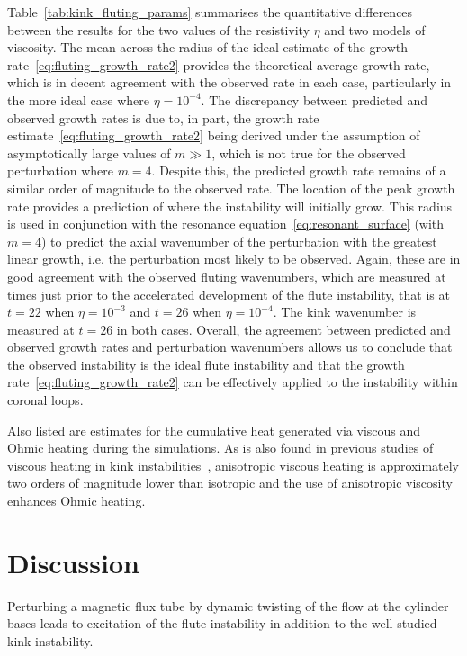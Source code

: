 \documentclass[fleqn,usenatbib]{mnras}
\newcommand{\rev}[1]{{\color{red} {#1}}}
\begin{document}
Table~\ref{tab:kink_fluting_params} summarises the quantitative differences
between the results for the two values of the resistivity $\eta$ and two models
of viscosity. \rev{The mean across the radius of the ideal estimate of the
growth rate~\eqref{eq:fluting_growth_rate2} provides the theoretical average
growth rate, which is in decent agreement with the observed rate in each case,
particularly in the more ideal case where $\eta=10^{-4}$. \rev{The
  discrepancy between predicted and observed growth rates is due to,
  in part, the growth rate estimate~\eqref{eq:fluting_growth_rate2}
  being derived under the assumption of asymptotically large values of
  $m \gg 1$, which is not true for the observed perturbation where
  $m=4$. Despite this, the predicted growth rate remains of a similar
  order of magnitude to the observed rate.} The location of the 
peak growth rate provides a prediction of where the instability will initially
grow. This radius is used in conjunction with the resonance
equation~\eqref{eq:resonant_surface} (with $m=4$) to predict the axial
wavenumber of the perturbation with the greatest linear growth, i.e. the
perturbation most likely to be observed. Again, these are in good agreement
with the observed fluting wavenumbers, which are measured at times just prior
to the accelerated development of the flute instability, that is at $t=22$ when
$\eta=10^{-3}$ and $t=26$ when $\eta = 10^{-4}$. The kink wavenumber is
measured at $t=26$ in both cases. Overall, the agreement between predicted and observed growth rates and perturbation wavenumbers allows us to conclude that the observed instability is the ideal flute instability and that the growth rate~\eqref{eq:fluting_growth_rate2} can be effectively applied to the instability within coronal loops.}

\rev{Also listed are estimates for
the cumulative heat generated via viscous and Ohmic heating during the
simulations. As is also found in previous studies of viscous heating in
kink instabilities~\citep{quinnEffectAnisotropicViscosity2020}, anisotropic
viscous heating is approximately two orders of magnitude lower than isotropic
and the use of anisotropic viscosity enhances Ohmic heating.}

\section{Discussion}
\label{sec-discussion}

\rev{Perturbing a magnetic flux tube by dynamic twisting of the flow
at the cylinder bases leads to excitation of the flute instability in
addition to the well studied kink instability.}
\end{document}
